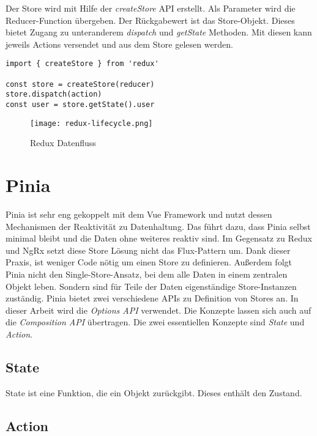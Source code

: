 Der Store wird mit Hilfe der \textit{createStore} API erstellt. Als Parameter wird die Reducer-Function übergeben. Der Rückgabewert ist das Store-Objekt. Dieses bietet Zugang zu unteranderem \textit{dispatch} und \textit{getState} Methoden. Mit diesen kann jeweils Actions versendet und aus dem Store gelesen werden.

\begin{lstlisting}
import { createStore } from 'redux'

const store = createStore(reducer)
store.dispatch(action)
const user = store.getState().user
\end{lstlisting}

\begin{figure}[H]
  \texttt{[image: redux-lifecycle.png]}
  \caption{Redux Datenfluss}
  \label{fig:redux-lifecycle}
\end{figure}

\section{Pinia}

Pinia ist sehr eng gekoppelt mit dem Vue Framework und nutzt dessen Mechanismen der Reaktivität zu Datenhaltung. Das führt dazu, dass Pinia selbst minimal bleibt und die Daten ohne weiteres reaktiv sind. Im Gegensatz zu Redux und NgRx setzt diese Store Lösung nicht das Flux-Pattern um. Dank dieser Praxis, ist weniger Code nötig um einen Store zu definieren. Außerdem folgt Pinia nicht den Single-Store-Ansatz, bei dem alle Daten in einem zentralen Objekt leben. Sondern sind für Teile der Daten eigenständige Store-Instanzen zuständig. Pinia bietet zwei verschiedene APIs zu Definition von Stores an. In dieser Arbeit wird die \textit{Options API} verwendet. Die Konzepte lassen sich auch auf die \textit{Composition API} übertragen.\cite{piniaDefiningAStore} Die zwei essentiellen Konzepte sind \textit{State} und \textit{Action}.

\subsection{State}

State ist eine Funktion, die ein Objekt zurückgibt. Dieses enthält den Zustand. 

\subsection{Action}

